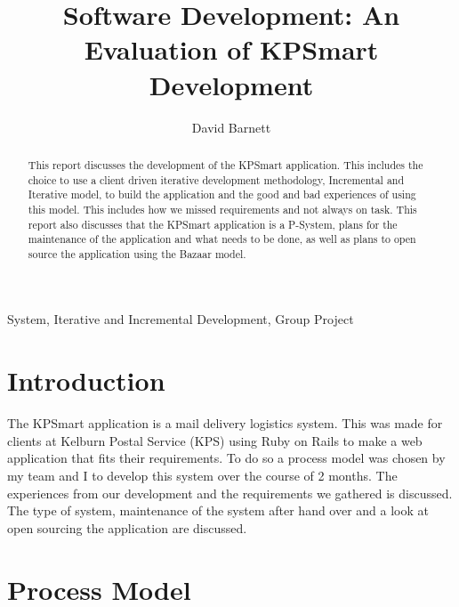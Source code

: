 \documentclass{style/CRPITStyle}
\begin{document}
\title{Software Development: An Evaluation of KPSmart Development}
\author{David Barnett}

\maketitle

\begin{abstract}
    This report discusses the development of the KPSmart application. 
    This includes the choice to use a client driven iterative development
    methodology, Incremental and Iterative model, to build the application and
    the good and bad experiences of using this model. This includes how we
    missed requirements and not always on task. This report also discusses that
    the KPSmart application is a P-System, plans for the maintenance of the
    application and what needs to be done, as well as plans to open source the
    application using the Bazaar model.
\end{abstract}

\vspace{.1in}

\/ System, Iterative and Incremental Development, Group Project

\vspace{.1in}

\section{Introduction}
The KPSmart application is a mail delivery logistics system. This was made for
clients at Kelburn Postal Service (KPS) using Ruby on Rails to make a web
application that fits their requirements. To do so a process model was chosen by
my team and I to develop this system over the course of 2 months. The
experiences from our development and the requirements we gathered is discussed.
The type of system, maintenance of the system after hand over and a look at open
sourcing the application are discussed.

\section{Process Model}
\end{document}
